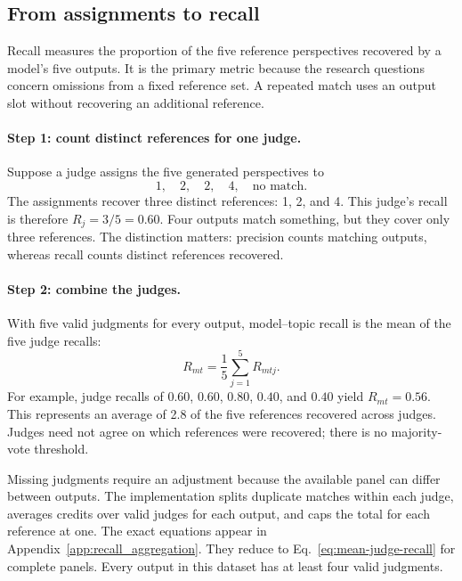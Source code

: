 \documentclass[11pt,a4paper]{article}
\begin{document}
\subsection{From assignments to recall}
\label{sec:recall}
Recall measures the proportion of the five reference perspectives recovered by a model's five outputs. It is the primary metric because the research questions concern omissions from a fixed reference set. A repeated match uses an output slot without recovering an additional reference.

\paragraph{Step 1: count distinct references for one judge.}
Suppose a judge assigns the five generated perspectives to
\[
1,\quad 2,\quad 2,\quad 4,\quad \text{no match}.
\]
The assignments recover three distinct references: 1, 2, and 4. This judge's recall is therefore $R_j=3/5=0.60$. Four outputs match something, but they cover only three references. The distinction matters: precision counts matching outputs, whereas recall counts distinct references recovered.

\paragraph{Step 2: combine the judges.}
With five valid judgments for every output, model--topic recall is the mean of the five judge recalls:
\begin{equation}
R_{mt}=\frac{1}{5}\sum_{j=1}^{5}R_{mtj}.
\label{eq:mean-judge-recall}
\end{equation}
For example, judge recalls of $0.60$, $0.60$, $0.80$, $0.40$, and $0.40$ yield $R_{mt}=0.56$. This represents an average of 2.8 of the five references recovered across judges. Judges need not agree on which references were recovered; there is no majority-vote threshold.

Missing judgments require an adjustment because the available panel can differ between outputs. The implementation splits duplicate matches within each judge, averages credits over valid judges for each output, and caps the total for each reference at one. The exact equations appear in Appendix~\ref{app:recall_aggregation}. They reduce to Eq.~\ref{eq:mean-judge-recall} for complete panels. Every output in this dataset has at least four valid judgments.
\end{document}
